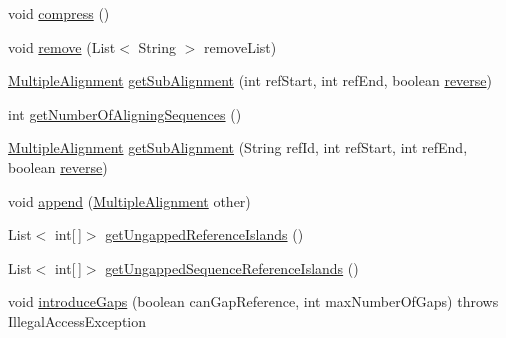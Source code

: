 \begin{DoxyCompactItemize}
\item 
void \hyperlink{classbroad_1_1core_1_1multiplealignment_1_1_multiple_alignment_ad475a9fa42f4aaa5fc128fd3688f9c38}{compress} ()
\item 
void \hyperlink{classbroad_1_1core_1_1multiplealignment_1_1_multiple_alignment_a8d1dfe05e52b47fec9892dd887394008}{remove} (List$<$ String $>$ remove\+List)
\item 
\hyperlink{classbroad_1_1core_1_1multiplealignment_1_1_multiple_alignment}{Multiple\+Alignment} \hyperlink{classbroad_1_1core_1_1multiplealignment_1_1_multiple_alignment_ac7d87da19e19722ff18a17a47a42504a}{get\+Sub\+Alignment} (int ref\+Start, int ref\+End, boolean \hyperlink{classbroad_1_1core_1_1multiplealignment_1_1_multiple_alignment_a8f6e8453396f6094a44858f6b8f66c31}{reverse})
\item 
int \hyperlink{classbroad_1_1core_1_1multiplealignment_1_1_multiple_alignment_a342692470eca8bfd3fc0d8227f66e0e3}{get\+Number\+Of\+Aligning\+Sequences} ()
\item 
\hyperlink{classbroad_1_1core_1_1multiplealignment_1_1_multiple_alignment}{Multiple\+Alignment} \hyperlink{classbroad_1_1core_1_1multiplealignment_1_1_multiple_alignment_ad8b69760ca48a1009539fd5fbf7c8c48}{get\+Sub\+Alignment} (String ref\+Id, int ref\+Start, int ref\+End, boolean \hyperlink{classbroad_1_1core_1_1multiplealignment_1_1_multiple_alignment_a8f6e8453396f6094a44858f6b8f66c31}{reverse})
\item 
void \hyperlink{classbroad_1_1core_1_1multiplealignment_1_1_multiple_alignment_a3d86dc775bd25f65cd6e97b5ef8b4411}{append} (\hyperlink{classbroad_1_1core_1_1multiplealignment_1_1_multiple_alignment}{Multiple\+Alignment} other)
\item 
List$<$ int\mbox{[}$\,$\mbox{]}$>$ \hyperlink{classbroad_1_1core_1_1multiplealignment_1_1_multiple_alignment_a565a11481850134152042482fb856421}{get\+Ungapped\+Reference\+Islands} ()
\item 
List$<$ int\mbox{[}$\,$\mbox{]}$>$ \hyperlink{classbroad_1_1core_1_1multiplealignment_1_1_multiple_alignment_aee4c7a91d6db5c3983b862dad485adb5}{get\+Ungapped\+Sequence\+Reference\+Islands} ()
\item 
void \hyperlink{classbroad_1_1core_1_1multiplealignment_1_1_multiple_alignment_a4ee614853a44ff109c0981a1513ebf46}{introduce\+Gaps} (boolean can\+Gap\+Reference, int max\+Number\+Of\+Gaps)  throws Illegal\+Access\+Exception 
\end{DoxyCompactItemize}

